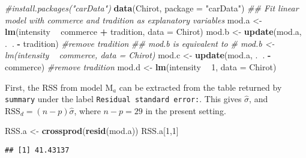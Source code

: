 \documentclass[]{book}
\newenvironment{Shaded}{\begin{snugshade}}{\end{snugshade}}
\newcommand{\CommentTok}[1]{\textcolor[rgb]{0.56,0.35,0.01}{\textit{#1}}}
\newcommand{\DataTypeTok}[1]{\textcolor[rgb]{0.13,0.29,0.53}{#1}}
\newcommand{\DecValTok}[1]{\textcolor[rgb]{0.00,0.00,0.81}{#1}}
\newcommand{\KeywordTok}[1]{\textcolor[rgb]{0.13,0.29,0.53}{\textbf{#1}}}
\newcommand{\NormalTok}[1]{#1}
\newcommand{\OperatorTok}[1]{\textcolor[rgb]{0.81,0.36,0.00}{\textbf{#1}}}
\newcommand{\StringTok}[1]{\textcolor[rgb]{0.31,0.60,0.02}{#1}}
\theoremstyle{definition}
\theoremstyle{definition}
\theoremstyle{definition}
\theoremstyle{remark}
\begin{document}
\begin{Shaded}
\begin{Highlighting}[]
\CommentTok{#install.packages("carData")}
\KeywordTok{data}\NormalTok{(Chirot, }\DataTypeTok{package =} \StringTok{"carData"}\NormalTok{)}
\CommentTok{## Fit linear model with commerce and tradition as explanatory variables}
\NormalTok{mod.a <-}\StringTok{ }\KeywordTok{lm}\NormalTok{(intensity }\OperatorTok{~}\StringTok{ }\NormalTok{commerce }\OperatorTok{+}\StringTok{ }\NormalTok{tradition, }\DataTypeTok{data =}\NormalTok{ Chirot)}
\NormalTok{mod.b <-}\StringTok{ }\KeywordTok{update}\NormalTok{(mod.a, .}\OperatorTok{~}\NormalTok{. }\OperatorTok{-}\StringTok{ }\NormalTok{tradition)  }\CommentTok{#remove tradition}
\CommentTok{## mod.b is equivalent to }
\CommentTok{# mod.b <- lm(intensity ~ commerce, data = Chirot)}
\NormalTok{mod.c <-}\StringTok{ }\KeywordTok{update}\NormalTok{(mod.a, .}\OperatorTok{~}\NormalTok{. }\OperatorTok{-}\StringTok{ }\NormalTok{commerce)  }\CommentTok{#remove tradition}
\NormalTok{mod.d <-}\StringTok{ }\KeywordTok{lm}\NormalTok{(intensity }\OperatorTok{~}\StringTok{ }\DecValTok{1}\NormalTok{, }\DataTypeTok{data =}\NormalTok{ Chirot)}
\end{Highlighting}
\end{Shaded}

First, the RSS from model \(\mathrm{M}_a\) can be extracted from the
table returned by \texttt{summary} under the label
\texttt{Residual\ standard\ error:}. This gives \(\widehat{\sigma}\),
and \(\mathrm{RSS}_d = (n-p)\widehat{\sigma}\), where \(n-p=29\) in the
present setting.

\begin{Shaded}
\begin{Highlighting}[]
\NormalTok{RSS.a <-}\StringTok{ }\KeywordTok{crossprod}\NormalTok{(}\KeywordTok{resid}\NormalTok{(mod.a))}
\NormalTok{RSS.a[}\DecValTok{1}\NormalTok{,}\DecValTok{1}\NormalTok{]}
\end{Highlighting}
\end{Shaded}

\begin{verbatim}
## [1] 41.43137
\end{verbatim}

\begin{Shaded}
\end{Shaded}
\end{document}
